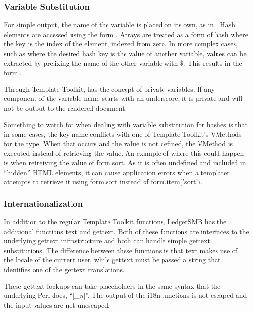 \subsubsection{Variable Substitution}
\label{subsec-company-config-templates-variable-sub}

For simple output, the name of the variable is placed on its own, as in
.  Hash elements are accessed using the form . 
Arrays are treated as a form of hash where the key is the index of the element,
indexed from zero.  In more complex cases, such as where the desired hash key
is the value of another variable, values can be extracted by prefixing the name
of the other variable with \$.  This results in the form .

Through Template Toolkit, \lsmbt{ }has the concept of private variables.  If
any component of the variable name starts with an underscore, it is private and
will not be output to the rendered document.

Something to watch for when dealing with variable substitution for hashes is
that in some cases, the key name conflicts with one of Template Toolkit's VMethods for the
type.  When that occurs and the value is not defined, the VMethod is executed
instead of retrieving the value.  An example of where this could happen is when
retreiving the value of form.sort.  As it is often undefined and included in
``hidden'' HTML elements, it can cause application errors when a templater
attempts to retrieve it using form.sort instead of form.item('sort').

\subsubsection{Internationalization}
\label{subsec-company-config-templates-internationalization}

In addition to the regular Template Toolkit functions, LedgerSMB has the
additional functions text and gettext.  Both of these functions are interfaces
to the underlying gettext infrastructure and both can handle simple gettext
substitutions.  The difference between these functions is that text makes use
of the locale of the current user, while gettext must be passed a string that
identifies one of the gettext translations.

These gettext lookups can take placeholders in the same syntax that the
underlying Perl does, ``[\_\emph{n}]''.  The output of the i18n functions is
not escaped and the input values are not unescaped.


